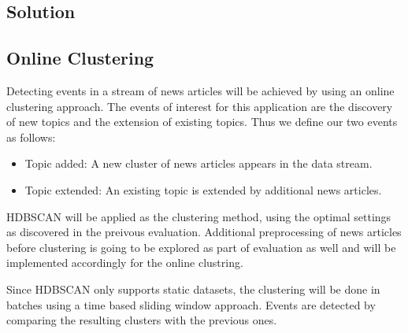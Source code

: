\subsection{Solution}

\subsection{Online Clustering}

Detecting events in a stream of news articles will be achieved by using an online clustering approach. The events of interest for this application are the discovery of new topics and the extension of existing topics. Thus we define our two events as follows:

\begin{itemize}
    \item Topic added: A new cluster of news articles appears in the data stream.
    \item Topic extended: An existing topic is extended by additional news articles.
\end{itemize}

HDBSCAN will be applied as the clustering method, using the optimal settings as discovered in the preivous evaluation. Additional preprocessing of news articles before clustering is going to be explored as part of evaluation as well and will be implemented accordingly for the online clustring.

Since HDBSCAN only supports static datasets, the clustering will be done in batches using a time based sliding window approach. Events are detected by comparing the resulting clusters with the previous ones.

